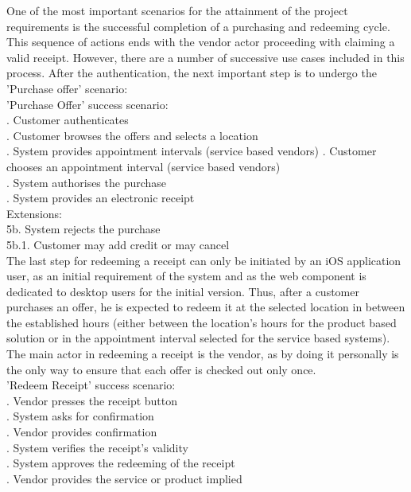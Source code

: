 One of the most important scenarios for the attainment of the project requirements is the successful completion of a purchasing and redeeming cycle. This sequence of actions ends with the vendor actor proceeding with claiming a valid receipt. However, there are a number of successive use cases included in this process. After the authentication, the next important step is to undergo the 'Purchase offer' scenario:\\

\noindent 'Purchase Offer' success scenario:\\
. Customer authenticates\\
. Customer browses the offers and selects a location\\
. System provides appointment intervals (service based vendors)
. Customer chooses an appointment interval (service based vendors)\\
. System authorises the purchase\\
. System provides an electronic receipt\\
Extensions:\\
\indent 5b. System rejects the purchase\\
\indent\indent 5b.1. Customer may add credit or may cancel\\

The last step for redeeming a receipt can only be initiated by an iOS application user, as an initial requirement of the system and as the web component is dedicated to desktop users for the initial version. Thus, after a customer purchases an offer, he is expected to redeem it at the selected location in between the established hours (either between the location's hours for the product based solution or in the appointment interval selected for the service based systems). The main actor in redeeming a receipt is the vendor, as by doing it personally is the only way to ensure that each offer is checked out only once.\\

\noindent 'Redeem Receipt' success scenario:\\
. Vendor presses the receipt button\\
. System asks for confirmation\\
. Vendor provides confirmation\\
. System verifies the receipt's validity\\
. System approves the redeeming of the receipt\\
. Vendor provides the service or product implied\\

